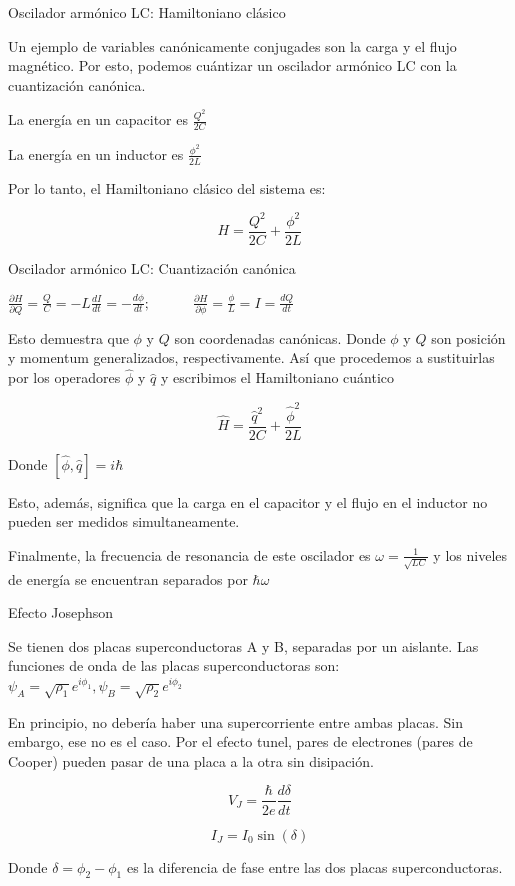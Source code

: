 \documentclass[spanish]{beamer}
\begin{document}
\begin{frame}{Oscilador armónico LC: Hamiltoniano clásico}
\protect\hypertarget{oscilador-armuxf3nico-lc-hamiltoniano-cluxe1sico}{}

Un ejemplo de variables canónicamente conjugades son la carga y el flujo
magnético. Por esto, podemos cuántizar un oscilador armónico LC con la
cuantización canónica.

La energía en un capacitor es \(\frac{Q^2}{2C}\)

La energía en un inductor es \(\frac{\phi^2}{2L}\)

Por lo tanto, el Hamiltoniano clásico del sistema es:

\[H = \frac{Q^2}{2C} + \frac{\phi^2}{2L}\]

\end{frame}

\begin{frame}{Oscilador armónico LC: Cuantización canónica}
\protect\hypertarget{oscilador-armuxf3nico-lc-cuantizaciuxf3n-canuxf3nica}{}

\(\frac{\partial H}{\partial Q} = \frac{Q}{C} = -L \frac{dI}{dt} =  -\frac{d\phi}{dt}; \qquad \quad  \frac{\partial H}{\partial \phi} = \frac{\phi}{L} = I = \frac{dQ}{dt}\)

Esto demuestra que \(\phi\) y \(Q\) son coordenadas canónicas. Donde
\(\phi\) y \(Q\) son posición y momentum generalizados, respectivamente.
Así que procedemos a sustituirlas por los operadores \(\hat{\phi}\) y
\(\hat{q}\) y escribimos el Hamiltoniano cuántico

\[\hat{H} = \frac{\hat{q}^2}{2C} + \frac{\hat{\phi}^2}{2L}\]

Donde \([\hat{\phi},\hat{q}]= i \hbar\)

Esto, además, significa que la carga en el capacitor y el flujo en el
inductor no pueden ser medidos simultaneamente.

Finalmente, la frecuencia de resonancia de este oscilador es
\(\omega = \frac{1}{\sqrt{L C}}\) y los niveles de energía se encuentran
separados por \(\hbar \omega\)

\end{frame}

\begin{frame}{Efecto Josephson}
\protect\hypertarget{efecto-josephson}{}

Se tienen dos placas superconductoras A y B, separadas por un aislante.
Las funciones de onda de las placas superconductoras son:
\(\psi_A = \sqrt{\rho_1} e^{i \phi_1}, \psi_B = \sqrt{\rho_2} e^{i \phi_2}\)

En principio, no debería haber una supercorriente entre ambas placas.
Sin embargo, ese no es el caso. Por el efecto tunel, pares de electrones
(pares de Cooper) pueden pasar de una placa a la otra sin disipación.

\[V_J = \frac{\hbar}{2e} \frac{d\delta}{dt}\]

\[I_J = I_0 \sin(\delta)\]

Donde \(\delta=\phi_2-\phi_1\) es la diferencia de fase entre las dos
placas superconductoras.

\end{frame}
\end{document}
